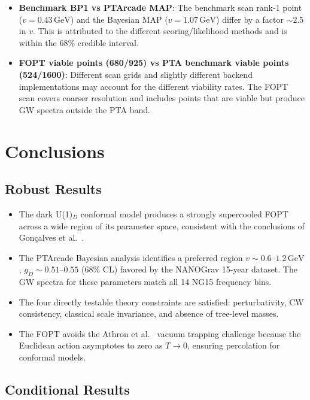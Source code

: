 \documentclass[a4paper,11pt]{article}
\newcommand{\GeV}{\,\text{GeV}}
\begin{document}
\begin{itemize}
\item \textbf{Benchmark BP1 vs PTArcade MAP}: The benchmark scan rank-1 point ($v=0.43\GeV$) and the Bayesian MAP ($v=1.07\GeV$) differ by a factor $\sim 2.5$ in $v$. This is attributed to the different scoring/likelihood methods and is within the 68\% credible interval.
\item \textbf{FOPT viable points (680/925) vs PTA benchmark viable points (524/1600)}: Different scan grids and slightly different backend implementations may account for the different viability rates. The FOPT scan covers coarser resolution and includes points that are viable but produce GW spectra outside the PTA band.
\end{itemize}

\section{Conclusions}

\subsection{Robust Results}

\begin{itemize}
\item The dark U(1)$_D$ conformal model produces a strongly supercooled FOPT across a wide region of its parameter space, consistent with the conclusions of Gon\c{c}alves et al.~\cite{goncalves2025}.
\item The PTArcade Bayesian analysis identifies a preferred region $v \sim 0.6$--$1.2\GeV$, $g_D \sim 0.51$--$0.55$ (68\% CL) favored by the NANOGrav 15-year dataset. The GW spectra for these parameters match all 14 NG15 frequency bins.
\item The four directly testable theory constraints are satisfied: perturbativity, CW consistency, classical scale invariance, and absence of tree-level masses.
\item The FOPT avoids the Athron et al.~\cite{athron2024} vacuum trapping challenge because the Euclidean action asymptotes to zero as $T\to 0$, ensuring percolation for conformal models.
\end{itemize}

\subsection{Conditional Results}
\end{document}
